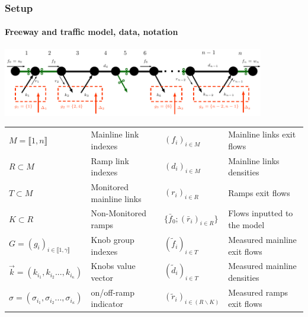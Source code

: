 \documentclass[fleqn]{beamer}
\begin{document}
\begin{frame}
	\frametitle{Setup}
	\framesubtitle{Freeway and traffic model, data, notation}
	\begin{center}
		\includegraphics[width=4.5in]{figures/presentation_scheme.pdf}
	\end{center}
	\scriptsize{\begin{tabular}{llll}
		$M=\llbracket 1,n \rrbracket$ & Mainline link indexes  & $(f_{i})_{i\in{M}}$ & Mainline links exit flows\\
		$R\subset{M}$ & Ramp link indexes & $(d_{i})_{i\in{M}}$ & Mainline links densities\\
		$T\subset{M}$ & Monitored mainline links & $(r_{i})_{i\in{R}}$ & Ramps exit flows\\
		$K\subset{R}$ & Non-Monitored ramps & $\{\bar{f}_{0};(\bar{r}_{i})_{i\in{R}}\} $ & Flows inputted to the model\\
		$G=(g_{i})_{i\in{\llbracket 1,\gamma \rrbracket}}$ & Knob group indexes  & $(\widetilde{f}_{i})_{i\in{T}}$ & Measured mainline exit flows\\
		$\vec{k}=(k_{i_{1}},k_{i_{2}}...,k_{i_{\kappa}})$ & Knobs value vector & $(\widetilde{d}_{i})_{i\in{T}}$ & Measured mainline densities\\
		$\sigma=(\sigma_{i_{1}},\sigma_{i_{2}}...,\sigma_{i_{\kappa}})$ & on/off-ramp indicator & $(\widetilde{r}_{i})_{i\in{(R\backslash K)}}$ & Measured ramps exit flows\\
	\end{tabular}} 
\end{frame}
\end{document}
